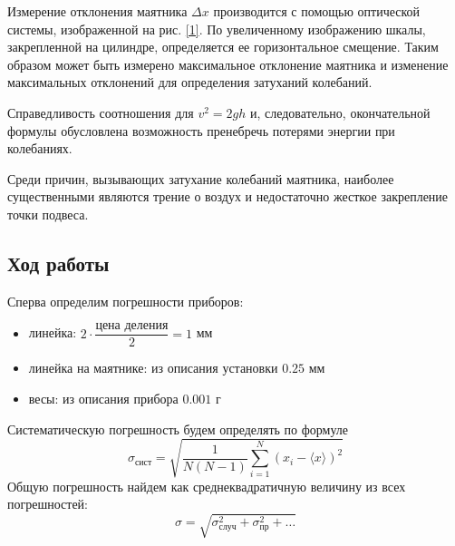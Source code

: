 \documentclass[a4paper,12pt]{article}
\begin{document}
Измерение отклонения маятника $\Delta x$ производится с помощью оптической системы, изображенной на рис. \ref{1}. По увеличенному изображению шкалы, закрепленной на цилиндре, определяется ее горизонтальное смещение. Таким образом может быть измерено максимальное отклонение маятника и изменение максимальных отклонений для определения затуханий колебаний.

Справедливость соотношения для $v^2 = 2gh$ и, следовательно, окончательной формулы обусловлена возможность пренебречь потерями энергии при колебаниях.

Среди причин, вызывающих затухание колебаний маятника, наиболее существенными являются трение о воздух и недостаточно жесткое закрепление точки подвеса.

\subsection*{Ход работы}
Сперва определим погрешности приборов:
\begin{itemize}
	\item линейка: $2\cdot\dfrac{\text{цена деления}}{2} = 1$ мм
	\item линейка на маятнике: из описания установки $0.25$ мм
	\item весы: из описания прибора $0.001$ г
\end{itemize}
Систематическую погрешность будем определять по формуле
$$
\sigma_{\text{сист}} = \sqrt{\frac{1}{N(N - 1)}\sum_{i = 1}^{N}(x_i - \langle x\rangle)^2}
$$
Общую погрешность найдем как среднеквадратичную величину из всех погрешностей:
$$
\sigma = \sqrt{\sigma^2_{\text{случ}} + \sigma^2_{\text{пр}} + \dots}
$$
\end{document}
